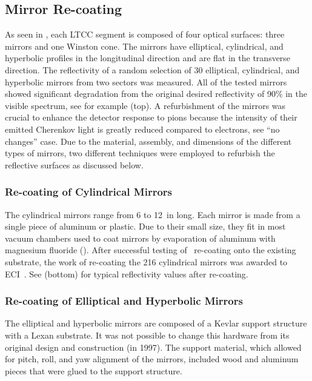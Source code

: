 \subsection{Mirror Re-coating}

As seen in , each LTCC segment is composed of four optical surfaces: three mirrors and one Winston cone.
The mirrors have elliptical, cylindrical, and hyperbolic profiles in the longitudinal direction and are flat in the transverse
direction. The reflectivity of a random selection of 30 elliptical, cylindrical, and hyperbolic mirrors from two sectors
was measured. All of the tested mirrors showed significant degradation from the original desired reflectivity of
90\% in the visible spectrum, see for example  (top). A refurbishment of the mirrors
was crucial to enhance the detector response to pions because the intensity of their emitted  Cherenkov light is greatly
reduced compared to electrons, see  ``no changes'' case. Due to the material, assembly,
and dimensions of the different types of mirrors, two different techniques were employed to refurbish the reflective
surfaces as discussed below.

\subsubsection{Re-coating of Cylindrical Mirrors}

The cylindrical mirrors range from 6 to 12~in long. Each mirror is made from a single piece of aluminum or plastic. Due
to their small size, they fit in most vacuum chambers used to coat mirrors by evaporation of aluminum with magnesium
fluoride (\coating). After successful testing of \coating\ re-coating onto the existing substrate, the work of
re-coating the 216 cylindrical mirrors was awarded to ECI~\cite{ECI}. See  (bottom)
for typical reflectivity values after re-coating.

\subsubsection{Re-coating of Elliptical and Hyperbolic Mirrors}

The elliptical and hyperbolic mirrors are composed of a Kevlar support structure with a Lexan substrate. It was not
possible to change this hardware from its original design and construction (in 1997). The support material, which
allowed for pitch, roll, and yaw alignment of the mirrors, included wood and aluminum pieces that were glued to the
support structure.


